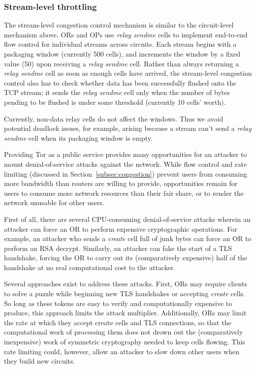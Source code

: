 \documentclass[times,10pt,twocolumn]{article}
\begin{document}
\subsubsection{Stream-level throttling}

The stream-level congestion control mechanism is similar to the
circuit-level mechanism above. ORs and OPs use \emph{relay sendme} cells
to implement end-to-end flow control for individual streams across
circuits. Each stream begins with a packaging window (currently 500 cells),
and increments the window by a fixed value (50) upon receiving a \emph{relay
sendme} cell. Rather than always returning a \emph{relay sendme} cell as soon
as enough cells have arrived, the stream-level congestion control also
has to check whether data has been successfully flushed onto the TCP
stream; it sends the \emph{relay sendme} cell only when the number of bytes pending
to be flushed is under some threshold (currently 10 cells' worth).

Currently, non-data relay cells do not affect the windows. Thus we
avoid potential deadlock issues, for example, arising because a stream
can't send a \emph{relay sendme} cell when its packaging window is empty.


\label{subsec:dos}

Providing Tor as a public service provides many opportunities for an
attacker to mount denial-of-service attacks against the network.  While
flow control and rate limiting (discussed in
Section~\ref{subsec:congestion}) prevent users from consuming more
bandwidth than routers are willing to provide, opportunities remain for
users to
consume more network resources than their fair share, or to render the
network unusable for other users.

First of all, there are several CPU-consuming denial-of-service
attacks wherein an attacker can force an OR to perform expensive
cryptographic operations.  For example, an attacker who sends a
\emph{create} cell full of junk bytes can force an OR to perform an RSA
decrypt.  Similarly, an attacker can
fake the start of a TLS handshake, forcing the OR to carry out its
(comparatively expensive) half of the handshake at no real computational
cost to the attacker.

Several approaches exist to address these attacks. First, ORs may
require clients to solve a puzzle \cite{puzzles-tls} while beginning new
TLS handshakes or accepting \emph{create} cells.  So long as these
tokens are easy to verify and computationally expensive to produce, this
approach limits the attack multiplier.  Additionally, ORs may limit
the rate at which they accept create cells and TLS connections, so that
the computational work of processing them does not drown out the (comparatively
inexpensive) work of symmetric cryptography needed to keep cells
flowing.  This rate limiting could, however, allow an attacker
to slow down other users when they build new circuits.
\end{document}
